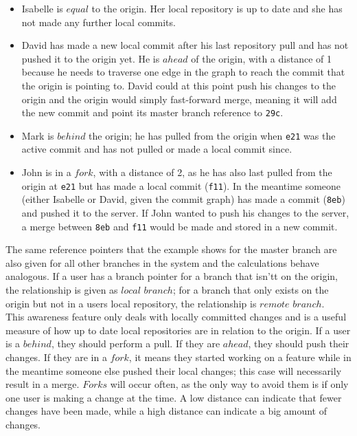 \begin{itemize}


\item Isabelle is $equal$ to the origin. Her local repository is up to date and she has not made any further local commits.
\item David has made a new local commit after his last repository pull and has not pushed it to the origin yet. He is $ahead$ of the origin, with a distance of 1 because he needs to traverse one edge in the graph to reach the commit that the origin is pointing to. David could at this point push his changes to the origin and the origin would simply fast-forward merge, meaning it will add the new commit and point its master branch reference to \texttt{29c}.
\item Mark is $behind$ the origin; he has pulled from the origin when \texttt{e21} was the active commit and has not pulled or made a local commit since.
\item John is in a $fork$, with a distance of 2, as he has also last pulled from the origin at \texttt{e21} but has made a local commit (\texttt{f11}). In the meantime someone (either Isabelle or David, given the commit graph) has made a commit (\texttt{8eb}) and pushed it to the server. If John wanted to push his changes to the server, a merge between \texttt{8eb} and \texttt{f11} would be made and stored in a new commit.

\end{itemize}


The same reference pointers that the example shows for the master branch are also given for all other branches in the system and the calculations behave analogous. If a user has a branch pointer for a branch that isn'tt on the origin, the relationship is given as $local$ $branch$; for a branch that only exists on the origin but not in a users local repository, the relationship is $remote$ $branch$. \\

This awareness feature only deals with locally committed changes and is a useful measure of how up to date local repositories are in relation to the origin. If a user is a $behind$, they should perform a pull. If they are $ahead$, they should push their changes. If they are in a $fork$, it means they started working on a feature while in the meantime someone else pushed their local changes; this case will necessarily result in a merge. $Forks$ will occur often, as the only way to avoid them is if only one user is making a change at the time. A low distance can indicate that fewer changes have been made, while a high distance can indicate a big amount of changes. \\

